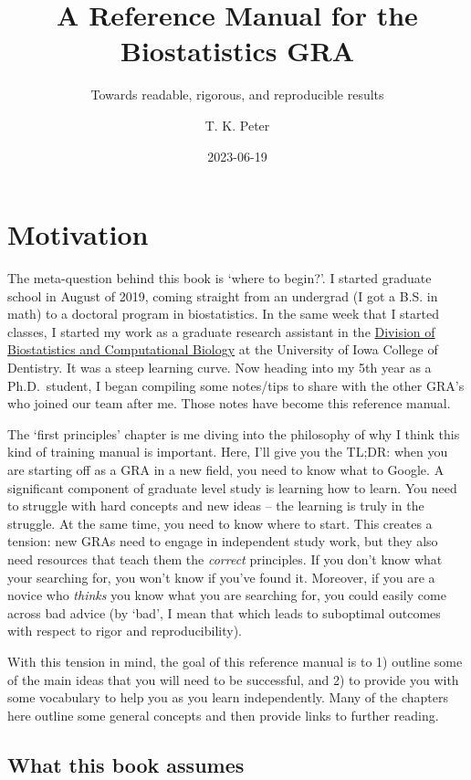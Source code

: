 \documentclass[
]{book}
\title{A Reference Manual for the Biostatistics GRA}
\subtitle{Towards readable, rigorous, and reproducible results}
\author{T. K. Peter}
\date{2023-06-19}
\begin{document}
\maketitle

{
\setcounter{tocdepth}{1}
\tableofcontents
}
\hypertarget{motivation}{%
\chapter{Motivation}\label{motivation}}

The meta-question behind this book is `where to begin?'. I started graduate school in August of 2019, coming straight from an undergrad (I got a B.S. in math) to a doctoral program in biostatistics. In the same week that I started classes, I started my work as a graduate research assistant in the \href{https://dentistry.uiowa.edu/research/biostatistics-and-computational-biology}{Division of Biostatistics and Computational Biology} at the University of Iowa College of Dentistry. It was a steep learning curve. Now heading into my 5th year as a Ph.D.~student, I began compiling some notes/tips to share with the other GRA's who joined our team after me. Those notes have become this reference manual.

The `first principles' chapter is me diving into the philosophy of why I think this kind of training manual is important. Here, I'll give you the TL;DR: when you are starting off as a GRA in a new field, you need to know what to Google. A significant component of graduate level study is learning how to learn. You need to struggle with hard concepts and new ideas -- the learning is truly in the struggle. At the same time, you need to know where to start. This creates a tension: new GRAs need to engage in independent study work, but they also need resources that teach them the \emph{correct} principles. If you don't know what your searching for, you won't know if you've found it. Moreover, if you are a novice who \emph{thinks} you know what you are searching for, you could easily come across bad advice (by `bad', I mean that which leads to suboptimal outcomes with respect to rigor and reproducibility).

With this tension in mind, the goal of this reference manual is to 1) outline some of the main ideas that you will need to be successful, and 2) to provide you with some vocabulary to help you as you learn independently. Many of the chapters here outline some general concepts and then provide links to further reading.

\hypertarget{what-this-book-assumes}{%
\section{What this book assumes}\label{what-this-book-assumes}}
\end{document}
